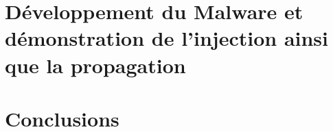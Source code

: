 \documentclass[12pt]{report}
\begin{document}
\chapter[Développement, Injection, Propagation]{Développement du Malware et démonstration de l'injection ainsi que la propagation}


\chapter{Conclusions}


\appendix



\end{document}
